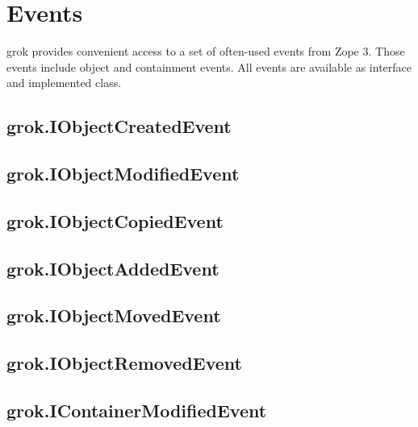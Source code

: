 \chapter{Events}

grok provides convenient access to a set of often-used events from Zope 3.
Those events include object and containment events. All events are available as
interface and implemented class.

    \section{grok.IObjectCreatedEvent}

    \section{grok.IObjectModifiedEvent}

    \section{grok.IObjectCopiedEvent}

    \section{grok.IObjectAddedEvent}

    \section{grok.IObjectMovedEvent}

    \section{grok.IObjectRemovedEvent}

    \section{grok.IContainerModifiedEvent}

